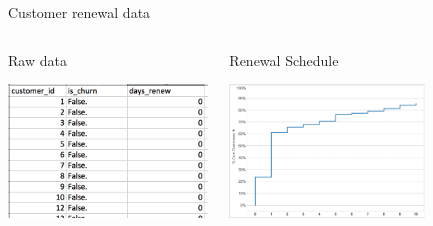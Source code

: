\documentclass[10pt]{beamer}
\begin{document}
    \begin{frame}{Customer renewal data}
        \begin{columns}[c]
          \begin{block}{Raw data}
            \begin{center}
              \includegraphics[height=100pt]{graphs/dataset_customer_renew}
            \end{center}
          \end{block}
          \begin{block}{Renewal Schedule}
            \begin{center}
              \includegraphics[height=100pt]{graphs/dataset_renewal_schedule}
            \end{center}
          \end{block}
        \end{columns}
    \end{frame}
\end{document}
